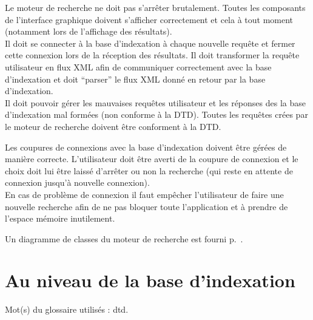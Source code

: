 \documentclass[a4paper,12pt]{report}
\begin{document}
Le moteur de recherche ne doit pas s'arrêter brutalement. Toutes les composants de l'interface graphique doivent s'afficher correctement et cela à tout moment (notamment lors de l'affichage des résultats).\\
Il doit se connecter à la base d'indexation à chaque nouvelle requête et fermer cette connexion lors de la réception des résultats. Il doit transformer la requête utilisateur en flux XML afin de communiquer correctement avec la base d'indexation et doit \enquote{parser} le flux XML donné  en retour par la base d'indexation.\\
Il doit pouvoir gérer les mauvaises requêtes utilisateur et les réponses des la base d'indexation mal formées (non conforme à la DTD). Toutes les requêtes crées par le moteur de recherche doivent être conforment à la DTD.

Les coupures de connexions avec la base d'indexation doivent être gérées de manière correcte. L'utilisateur doit être averti de la coupure de connexion et le choix doit lui être laissé d'arrêter ou non la recherche (qui reste en attente de connexion jusqu'à nouvelle connexion).\\
En cas de problème de connexion il faut empêcher l'utilisateur de faire une nouvelle recherche afin de ne pas bloquer toute l'application et à prendre de l'espace mémoire inutilement.

Un diagramme de classes du moteur de recherche est fourni p.~\pageref{diagramme_classes_mr}.

\section{Au niveau de la base d'indexation}
Mot(s) du glossaire utilisés :  \gls{dtd}.
\end{document}
